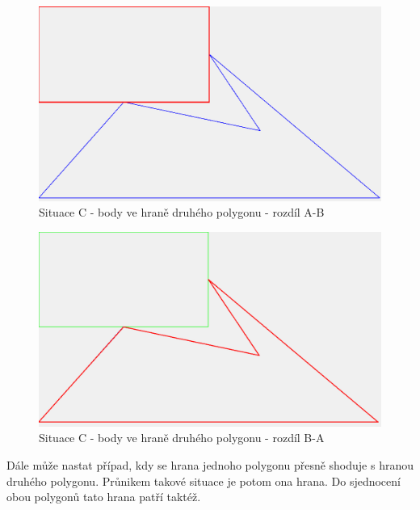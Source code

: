 \documentclass[a4paper,11pt,twoside]{article}
\begin{document}
\vspace{0.2cm}
\begin{figure}[hbt!] 
\begin{center}
\includegraphics[width=15cm]{pictures/C_diffAB.png} 
\caption[Situace C - body ve hraně druhého polygonu - rozdíl A-B]{Situace C - body ve hraně druhého polygonu - rozdíl A-B}
\label{fig:C_diffAB}
\end{center}
\end{figure}

\vspace{0.2cm}
\begin{figure}[hbt!] 
\begin{center}
\includegraphics[width=15cm]{pictures/C_diffBA.png} 
\caption[Situace C - body ve hraně druhého polygonu - rozdíl B-A]{Situace C - body ve hraně druhého polygonu - rozdíl B-A}
\label{fig:C_diffBA}
\end{center}
\end{figure}

Dále může nastat případ, kdy se hrana jednoho polygonu přesně shoduje s hranou druhého polygonu. Průnikem takové situace je potom ona hrana. Do sjednocení obou polygonů tato hrana patří taktéž.
\end{document}
